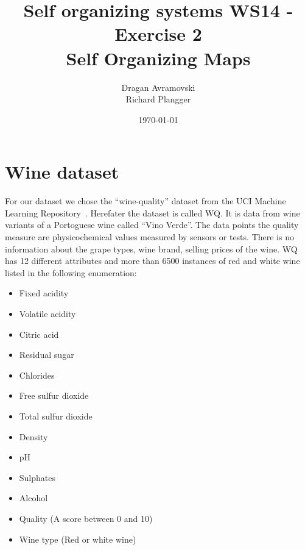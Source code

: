 \documentclass{acm_proc_article-sp}
\begin{document}
\title{Self organizing systems WS14 - Exercise 2\\
       Self Organizing Maps}%

\author{
\alignauthor
Dragan Avramovski\\
\alignauthor
Richard Plangger\\
}

\date{\today}

\maketitle


\begin{abstract}
\end{abstract}


\section{Wine dataset}

For our dataset we chose the ``wine-quality'' dataset from the UCI Machine Learning Repository~\cite{ucirepo}. 
Herefater the dataset is called WQ.
It is data from wine variants of a Portoguese wine called ``Vino Verde''.
The data points the quality measure are physicochemical values measured
by sensors or tests. There is no information about the grape types,
wine brand, selling prices of the wine.
WQ has 12 different attributes and more than 6500 instances of red and white wine listed in the following enumeration:

\begin{itemize}
    \item Fixed acidity
    \item Volatile acidity
    \item Citric acid
    \item Residual sugar
    \item Chlorides
    \item Free sulfur dioxide
    \item Total sulfur dioxide
    \item Density
    \item pH
    \item Sulphates
    \item Alcohol
    \item Quality (A score between 0 and 10)
    \item Wine type (Red or white wine)
\end{itemize}
\end{document}
